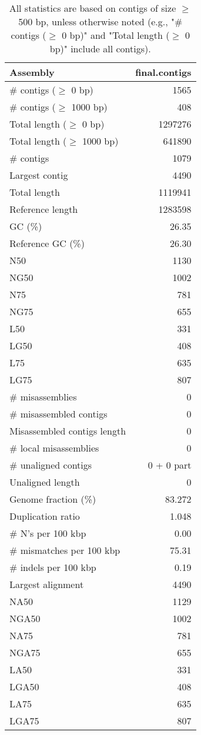 \documentclass[12pt,a4paper]{article}
\begin{document}
\begin{table}[ht]
\begin{center}
\caption{All statistics are based on contigs of size $\geq$ 500 bp, unless otherwise noted (e.g., "\# contigs ($\geq$ 0 bp)" and "Total length ($\geq$ 0 bp)" include all contigs).}
\begin{tabular}{|l*{1}{|r}|}
\hline
Assembly & final.contigs \\ \hline
\# contigs ($\geq$ 0 bp) & 1565 \\ \hline
\# contigs ($\geq$ 1000 bp) & 408 \\ \hline
Total length ($\geq$ 0 bp) & 1297276 \\ \hline
Total length ($\geq$ 1000 bp) & 641890 \\ \hline
\# contigs & 1079 \\ \hline
Largest contig & 4490 \\ \hline
Total length & 1119941 \\ \hline
Reference length & 1283598 \\ \hline
GC (\%) & 26.35 \\ \hline
Reference GC (\%) & 26.30 \\ \hline
N50 & 1130 \\ \hline
NG50 & 1002 \\ \hline
N75 & 781 \\ \hline
NG75 & 655 \\ \hline
L50 & 331 \\ \hline
LG50 & 408 \\ \hline
L75 & 635 \\ \hline
LG75 & 807 \\ \hline
\# misassemblies & 0 \\ \hline
\# misassembled contigs & 0 \\ \hline
Misassembled contigs length & 0 \\ \hline
\# local misassemblies & 0 \\ \hline
\# unaligned contigs & 0 + 0 part \\ \hline
Unaligned length & 0 \\ \hline
Genome fraction (\%) & 83.272 \\ \hline
Duplication ratio & 1.048 \\ \hline
\# N's per 100 kbp & 0.00 \\ \hline
\# mismatches per 100 kbp & 75.31 \\ \hline
\# indels per 100 kbp & 0.19 \\ \hline
Largest alignment & 4490 \\ \hline
NA50 & 1129 \\ \hline
NGA50 & 1002 \\ \hline
NA75 & 781 \\ \hline
NGA75 & 655 \\ \hline
LA50 & 331 \\ \hline
LGA50 & 408 \\ \hline
LA75 & 635 \\ \hline
LGA75 & 807 \\ \hline
\end{tabular}
\end{center}
\end{table}
\end{document}
